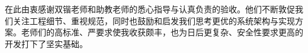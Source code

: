 \documentclass[11pt]{article}
\begin{document}
\vspace{0.5em}
在此由衷感谢双锴老师和助教老师的悉心指导与认真负责的验收。他们不断敦促我们关注工程细节、重视规范，同时也鼓励和启发我们思考更优的系统架构与实现方案。老师们的高标准、严要求使我收获颇丰，也为日后更复杂、安全性要求更高的开发打下了坚实基础。


% 

% 
\end{document}
